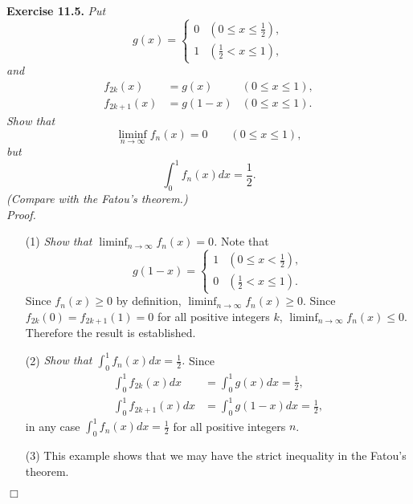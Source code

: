 \documentclass{article}
\begin{document}



\textbf{Exercise 11.5.}
\emph{Put
  \begin{equation*}
    g(x) =
    \begin{cases}
      0 & (0 \leq x \leq \frac{1}{2}), \\
      1 & (\frac{1}{2} < x \leq 1),
    \end{cases}
  \end{equation*}
  and
  \begin{align*}
    f_{2k}(x) &= g(x) &(0 \leq x \leq 1), \\
    f_{2k+1}(x) &= g(1-x) &(0 \leq x \leq 1).
  \end{align*}
Show that
\[
  \liminf_{n \to \infty} f_n(x) = 0
  \qquad
  (0 \leq x \leq 1),
\]
but
\[
  \int_{0}^{1} f_n(x)dx = \frac{1}{2}.
\]
(Compare with the Fatou's theorem.)} \\

\emph{Proof.}
\begin{enumerate}
\item[(1)]
  \emph{Show that $\liminf_{n \to \infty} f_n(x) = 0$.}
  Note that
  \begin{equation*}
    g(1-x) =
    \begin{cases}
      1 & (0 \leq x < \frac{1}{2}), \\
      0 & (\frac{1}{2} < x \leq 1).
    \end{cases}
  \end{equation*}
  Since $f_n(x) \geq 0$ by definition,
  $\liminf_{n \to \infty} f_n(x) \geq 0$.
  Since $f_{2k}(0) = f_{2k+1}(1) = 0$ for all positive integers $k$,
  $\liminf_{n \to \infty} f_n(x) \leq 0$.
  Therefore the result is established.

\item[(2)]
  \emph{Show that $\int_{0}^{1} f_n(x)dx = \frac{1}{2}$.}
  Since
  \begin{align*}
    \int_{0}^{1} f_{2k}(x)dx
    &= \int_{0}^{1} g(x)dx = \frac{1}{2}, \\
    \int_{0}^{1} f_{2k+1}(x)dx
    &= \int_{0}^{1} g(1-x)dx = \frac{1}{2},
  \end{align*}
  in any case $\int_{0}^{1} f_n(x)dx = \frac{1}{2}$ for all positive integers $n$.

\item[(3)]
  This example shows that we may have the strict inequality in the Fatou's theorem.
\end{enumerate}
$\Box$ \\
\end{document}
